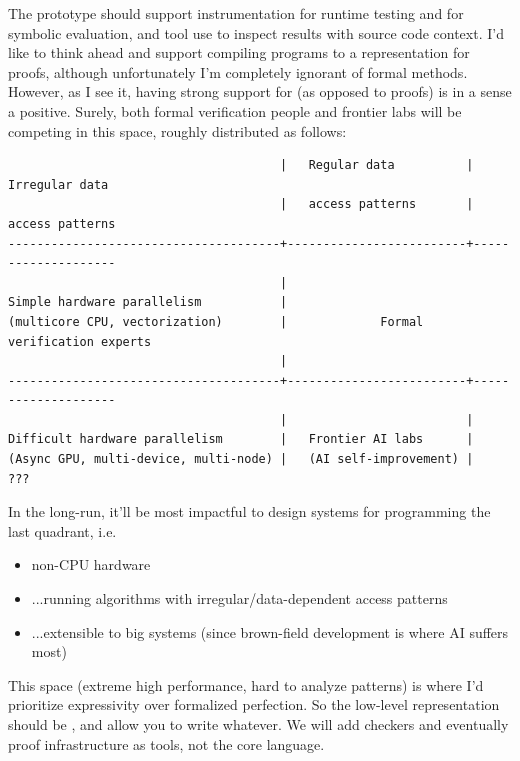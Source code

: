 The prototype should support instrumentation for runtime testing and for symbolic evaluation, and tool use to inspect results with source code context.
I'd like to think ahead and support compiling programs to a representation for proofs, although unfortunately I'm completely ignorant of formal methods.
However, as I see it, having strong support for  (as opposed to proofs) is in a sense a positive.
Surely, both formal verification people and frontier labs will be competing in this space, roughly distributed as follows:

\begin{verbatim}
                                      |   Regular data          |   Irregular data
                                      |   access patterns       |   access patterns
--------------------------------------+-------------------------+--------------------
                                      |
Simple hardware parallelism           |
(multicore CPU, vectorization)        |             Formal verification experts
                                      |
--------------------------------------+-------------------------+--------------------
                                      |                         |
Difficult hardware parallelism        |   Frontier AI labs      |
(Async GPU, multi-device, multi-node) |   (AI self-improvement) |        ???
\end{verbatim}

In the long-run, it'll be most impactful to design systems for programming the last quadrant, i.e.
\begin{itemize}
  \item non-CPU hardware
  \item ...running algorithms with irregular/data-dependent access patterns
  \item ...extensible to big systems (since brown-field development is where AI suffers most)
\end{itemize}
This space (extreme high performance, hard to analyze patterns) is where I'd prioritize expressivity over formalized perfection.
So the low-level representation should be , and allow you to write whatever.
We will add checkers and eventually proof infrastructure as tools, not the core language.

